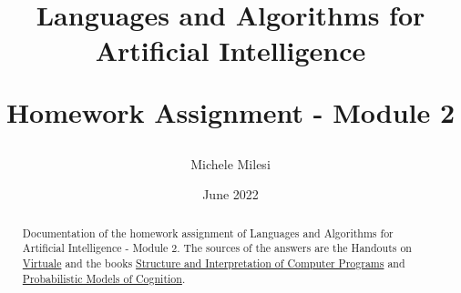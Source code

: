 \documentclass{article}
\title{
    Languages and Algorithms for Artificial Intelligence

    \vspace{0.3cm}
    \large Homework Assignment - Module 2
}
\author{Michele Milesi}
\date{June 2022}
\begin{document}
\maketitle

\begin{abstract}
    Documentation of the homework assignment of Languages and Algorithms for Artificial Intelligence - Module 2.
    The sources of the answers are the Handouts on \href{https://virtuale.unibo.it/course/view.php?id=29870}{Virtuale} and
    the books \href{https://web.mit.edu/6.001/6.037/sicp.pdf}{Structure and Interpretation of Computer Programs} and 
    \href{http://v1.probmods.org/index.html}{Probabilistic Models of Cognition}.
\end{abstract}









\end{document}
